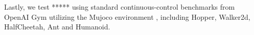 Lastly, we test ***** using standard continuous-control benchmarks from OpenAI Gym utilizing the Mujoco environment \citep{brockman2016openai,todorov2012mujoco}, including Hopper, Walker2d, HalfCheetah, Ant and Humanoid. 




%
%

